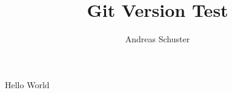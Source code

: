 \documentclass[a4paper,10pt]{article}
\title{Git Version Test}
\author{Andreas Schuster}
\begin{document}
Hello World


\end{document}
